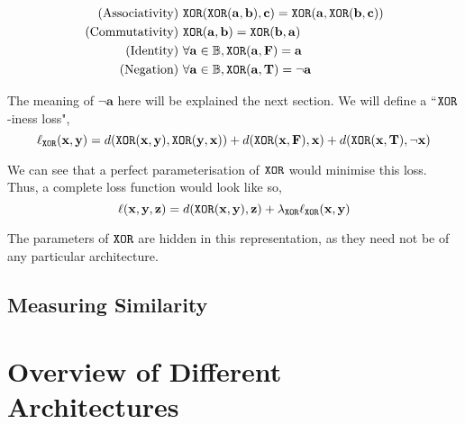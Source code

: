 $$
\begin{aligned}
\text{(Associativity)}&\ \texttt{XOR}(\texttt{XOR}(\mathbf{a, b}), \mathbf{c}) = \texttt{XOR}(\mathbf{a}, \texttt{XOR}(\mathbf{b, c})) \\
\text{(Commutativity)}&\ \texttt{XOR}(\mathbf{a, b}) = \texttt{XOR}(\mathbf{b, a}) \\
\text{(Identity)}&\ \forall \mathbf{a} \in \mathbb{B}, \texttt{XOR}(\mathbf{a}, \textbf{F}) = \mathbf{a} \\
\text{(Negation)}&\ \forall \mathbf{a} \in \mathbb{B}, \texttt{XOR}(\mathbf{a}, \textbf{T}) = \lnot \mathbf{a}
\end{aligned}
$$

The meaning of $\lnot\mathbf{a}$ here will be explained the next section. We will define a ``$\texttt{XOR}$-iness loss",
$$\ell_{\texttt{XOR}}(\mathbf{x,y}) = d(\texttt{XOR}(\mathbf{x, y}),\texttt{XOR}(\mathbf{y, x})) + d(\texttt{XOR}(\mathbf{x}, \textbf{F}), \mathbf{x}) + d(\texttt{XOR}(\mathbf{x}, \textbf{T}), \lnot \mathbf{x})$$

We can see that a perfect parameterisation of $\texttt{XOR}$ would minimise this loss. Thus, a complete loss function would look like so,
$$\ell(\mathbf{x,y,z}) = d(\texttt{XOR}(\mathbf{x,y}),\mathbf{z}) + \lambda_{\texttt{XOR}} \ell_{\texttt{XOR}}(\mathbf{x,y})$$

The parameters of $\texttt{XOR}$ are hidden in this representation, as they need not be of any particular architecture.

\subsection{Measuring Similarity}
 
\section{Overview of Different Architectures}